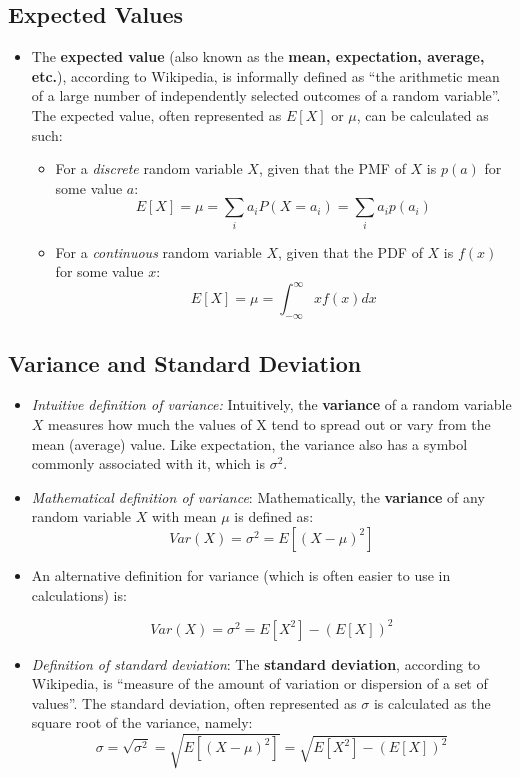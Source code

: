 \documentclass[12pt]{article}
\begin{document}
\subsection{Expected Values}
\begin{itemize}
	\item The \textbf{expected value} (also known as the \textbf{mean, expectation,
		      average, etc.}), according to Wikipedia, is informally
	      defined as ``the arithmetic mean of a large number of independently selected
	      outcomes of a random variable''. The expected value, often represented as $E[X]$ or $\mu$,
	      can be calculated as such:
	      \begin{itemize}
		      \item For a \textit{discrete} random variable $X$, given that the PMF of $X$ is $p(a)$ for some value $a$:
		            \[
			            E[X] = \mu = \displaystyle\sum_{i} a_i P(X=a_i) = \displaystyle\sum_{i} a_i p(a_i)
		            \]
		      \item For a \textit{continuous} random variable $X$, given that
		            the PDF of $X$ is $f(x)$ for some value $x$:
		            \[
			            E[X] = \mu = \int_{-\infty}^{\infty}x f(x) dx
		            \]
	      \end{itemize}
\end{itemize}


\subsection{Variance and Standard Deviation}
\begin{itemize}
	\item \textit{Intuitive definition of variance:} Intuitively, the \textbf{variance} of a random variable $X$ measures how much
	      the values of X tend to spread out or vary from the mean (average) value. Like
	      expectation, the variance also has a symbol commonly associated with it, which is $\sigma^2$.
	\item \textit{Mathematical definition of variance}: Mathematically, the \textbf{variance} of any random variable $X$ with mean $\mu$
	      is defined as:
	      \[
		      Var(X) = \sigma^2 = E[(X-\mu)^2]
	      \]
	\item  An alternative definition for variance (which is often easier to use in calculations) is:

	      \[
		      Var(X) = \sigma^2 = E[X^2] - (E[X])^2
	      \]
	\item \textit{Definition of standard deviation}: The \textbf{standard
		      deviation}, according to Wikipedia, is ``measure of the amount of
	      variation or dispersion of a set of values''. The standard deviation,
	      often represented as $\sigma$ is calculated as the square root of the
	      variance, namely:
	      \[
		      \sigma = \sqrt{\sigma^2} = \sqrt{E[(X-\mu)^2]} = \sqrt{E[X^2] - (E[X])^2}
	      \]
\end{itemize}
\end{document}
